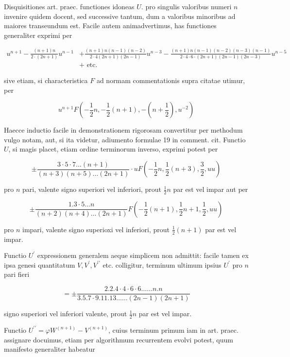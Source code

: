 \documentclass[10pt]{article}
\begin{document}
Disquisitiones art. praec. functiones idoneas \(U\). pro singulis valoribus numeri \(n\) invenire quidem docent, sed successive tantum, dum a valoribus minoribus ad maiores transeundum est. Facile autem animadvertimus, has functiones generaliter exprimi per

\[
\begin{aligned}
u^{n+1}-\frac{(n+1) n}{2 \cdot(2 n+1)} u^{n-1} & +\frac{(n+1) n(n-1)(n-2)}{2 \cdot 4(2 n+1)(2 n-1)} u^{n-3}-\frac{(n+1) n(n-1)(n-2)(n-3)(n-1)}{2 \cdot 4 \cdot 6 \cdot(2 n+1)(2 n-1)(2 n-3)} u^{n-5} \\
& + \text { etc. }
\end{aligned}
\]

sive etiam, si characteristica \(F\) ad normam commentationis supra citatae utimur, per

\[
u^{n+1} F\left(-\frac{1}{2} n,-\frac{1}{2}(n+1),-\left(n+\frac{1}{2}\right), u^{-2}\right)
\]

Haecce inductio facile in demonstrationem rigorosam convertitur per methodum vulgo notam, aut, si ita videtur, adiumento formulae 19 in comment. cit. Functio \(U\), si magis placet, etiam ordine terminorum inverso, exprimi potest per

\[
\pm \frac{3 \cdot 5 \cdot 7 \ldots(n+1)}{(n+3)(n+5) \ldots(2 n+1)} \cdot u F\left(-\frac{1}{2} n, \frac{1}{2}(n+3), \frac{3}{2}, u u\right)
\]

pro \(n\) pari, valente signo superiori vel inferiori, prout \(\frac{1}{2} n\) par est vel impar aut per

\[
\pm \frac{1.3 \cdot 5 \ldots n}{(n+2)(n+4) \ldots(2 n+1)} F\left(-\frac{1}{2}(n+1), \frac{1}{2} n+1, \frac{1}{2}, u u\right)
\]

pro \(n\) impari, valente signo superioxi vel inferiori, prout \(\frac{1}{2}(n+1)\) par est vel impar.

Functio \(U^{\prime}\) expressionem generalem aeque simplicem non admittit: facile tamen ex ipsa genesi quantitatum \(V, V^{\prime}, V^{\prime \prime}\) etc. colligitur, terminum ultimum ipsius \(U^{\prime}\) pro \(n\) pari fieri

\[
= \pm \frac{2.2 .4 \cdot 4 \cdot 6 \cdot 6 \ldots \ldots n . n}{3.5 .7 \cdot 9.11 .13 \ldots \ldots(2 n-1)(2 n+1)}
\]

signo superiori vel inferiori valente, prout \(\frac{1}{2} n\) par est vel impar.

Functio \(U^{\prime \prime}=\varphi W^{(n+1)}-V^{(n+1)}\), cuius terminum primum iam in art. praec. assignare docuimus, etiam per algorithmum recurrentem evolvi potest, quum manifesto generaliter habeatur
\end{document}
